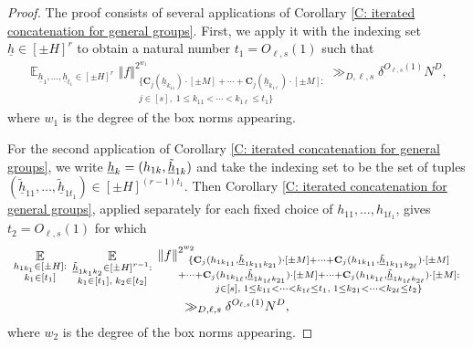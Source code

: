 \documentclass[11pt]{amsart}
\theoremstyle{definition}
\DeclareMathOperator*{\E}{\mathbb{E}}
\newcommand{\bc}{{\textbf{C}}}
\newcommand{\uh}{{\underline{h}}}
\newcommand{\norm}[1]{\left\Vert #1\right\Vert}
\begin{document}
\begin{proof}
    The proof consists of several applications of Corollary \ref{C: iterated concatenation for general groups}. First, we apply it with the indexing set $\uh\in[\pm H]^r$ to obtain a natural number $t_1 = O_{\ell, s}(1)$ such that
    \begin{align*}
        \E_{\uh_1, \ldots, \uh_{t_1}\in[\pm H]^r}\norm{f}_{\substack{\{\bc_j(\uh_{k_{11}})\cdot[\pm M]+\cdots + \bc_j(\uh_{k_{1 \ell}}) \cdot[\pm M]:\\ j\in[s],\; 1\leq k_{11} < \cdots < k_{1 \ell}\leq t_1\}}}^{2^{w_1}}\gg_{D, \ell, s} \delta^{O_{\ell, s}(1)} N^D,
    \end{align*}
    where $w_1$ is the degree of the box norms appearing. 

    For the second application of Corollary \ref{C: iterated concatenation for general groups}, we write $\uh_k = (h_{1k}, \Tilde{\uh}_{1k})$ and take the indexing set to be the set of tuples $(\tilde{\uh}_{11}, \ldots, \tilde{\uh}_{1 t_1})\in[\pm H]^{(r-1)t_1}$. Then Corollary \ref{C: iterated concatenation for general groups}, applied separately for each fixed choice of $h_{11}, \ldots, h_{1t_1}$, gives $t_2 = O_{\ell, s}(1)$ for which
    \begin{multline*}
        \E_{\substack{h_{1k_1}\in[\pm H]:\\ k_1\in[t_1]}}\;
        \E_{\substack{\Tilde{\uh}_{1k_1 k_2}\in[\pm H]^{r-1}:\\ k_1\in [t_1],\; k_2\in[t_2]}}\;
        \norm{f}_{\substack{\{\bc_j(h_{1k_{11}}, \Tilde{\uh}_{1k_{11}k_{21}})\cdot[\pm M]+\cdots + \bc_j(h_{1k_{11}}, \Tilde{\uh}_{1k_{11}k_{2\ell}})\cdot[\pm M]\\
        +\cdots + \bc_j(h_{1k_{1\ell}}, \Tilde{\uh}_{1k_{1\ell}k_{21}})\cdot[\pm M]+\cdots + \bc_j(h_{1k_{1\ell}}, \Tilde{\uh}_{1k_{1\ell}k_{2\ell}})\cdot[\pm M]:\\ j\in[s],\; 1\leq k_{11} < \cdots < k_{1 \ell}\leq t_1,\; 1\leq k_{21} < \cdots < k_{2 \ell}\leq t_2 \}}}^{2^{w_2}}\\ \gg_{D, \ell, s} \delta^{O_{\ell, s}(1)} N^D,
    \end{multline*}
    where $w_2$ is the degree of the box norms appearing.


\end{proof}
\end{document}
